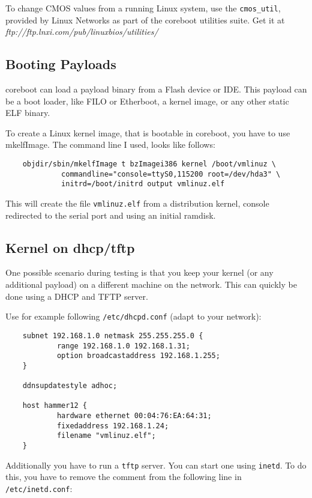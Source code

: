 \documentclass[titlepage,12pt]{article}
\begin{document}
To change CMOS values from a running Linux system, use the
\texttt{cmos\_util}, provided by Linux Networks as part of the coreboot
utilities suite. Get it at
\textit{ftp://ftp.lnxi.com/pub/linuxbios/utilities/}

\subsection {Booting Payloads}
coreboot can load a payload binary from a Flash device or IDE. This
payload can be a boot loader, like FILO or Etherboot, a kernel image, or
any other static ELF binary.

To create a Linux kernel image, that is bootable in coreboot, you have
to use mkelfImage. The command line I used, looks like follows:

\begin{verbatim}
    objdir/sbin/mkelfImage t bzImagei386 kernel /boot/vmlinuz \
             commandline="console=ttyS0,115200 root=/dev/hda3" \
             initrd=/boot/initrd output vmlinuz.elf
\end{verbatim}


This will create the file \texttt{vmlinuz.elf} from a distribution
kernel, console redirected to the serial port and using an initial
ramdisk.

\subsection{Kernel on dhcp/tftp}

One possible scenario during testing is that you keep your kernel (or
any additional payload) on a different machine on the network. This can
quickly be done using a DHCP and TFTP server.

Use for example following \texttt{/etc/dhcpd.conf} (adapt to your
network):

\begin{verbatim}
    subnet 192.168.1.0 netmask 255.255.255.0 {
            range 192.168.1.0 192.168.1.31;
            option broadcastaddress 192.168.1.255;
    }
    
    ddnsupdatestyle adhoc;
    
    host hammer12 {
            hardware ethernet 00:04:76:EA:64:31;
            fixedaddress 192.168.1.24;
            filename "vmlinuz.elf";
    }
\end{verbatim}


Additionally you have to run a \texttt{tftp} server. You can start one
using \texttt{inetd}.  To do this, you have to remove the comment from
the following line in \texttt{/etc/inetd.conf}:
\end{document}
